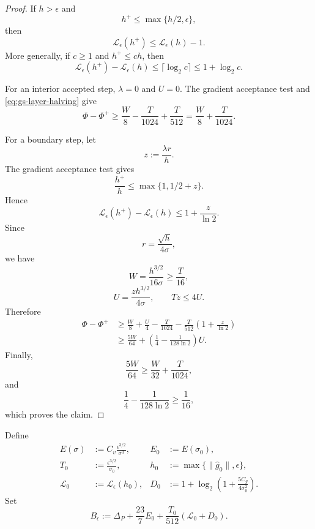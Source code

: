 \begin{proof}
If $h>\epsilon$ and
\[
    h^+\le\max\{h/2,\epsilon\},
\]
then
\begin{equation}
    \mathcal L_\epsilon(h^+)
    \le
    \mathcal L_\epsilon(h)-1.
    \label{eq:gs-layer-halving}
\end{equation}
More generally, if $c\ge1$ and $h^+\le ch$, then
\begin{equation}
    \mathcal L_\epsilon(h^+)
    -
    \mathcal L_\epsilon(h)
    \le
    \lceil\log_2c\rceil
    \le
    1+\log_2c.
    \label{eq:gs-layer-growth}
\end{equation}

For an interior accepted step,
$\lambda=0$ and $U=0$.
The gradient acceptance test and
\eqref{eq:gs-layer-halving} give
\[
    \Phi-\Phi^+
    \ge
    \frac W8
    -
    \frac T{1024}
    +
    \frac T{512}
    =
    \frac W8+\frac T{1024}.
\]

For a boundary step, let
\[
    z:=\frac{\lambda r}{h}.
\]
The gradient acceptance test gives
\[
    \frac{h^+}{h}
    \le
    \max\{1,1/2+z\}.
\]
Hence
\[
    \mathcal L_\epsilon(h^+)
    -
    \mathcal L_\epsilon(h)
    \le
    1+\frac z{\ln2}.
\]
Since
\[
    r=\frac{\sqrt h}{4\sigma},
\]
we have
\[
    W
    =
    \frac{h^{3/2}}{16\sigma}
    \ge
    \frac T{16},
\]
\[
    U
    =
    \frac{zh^{3/2}}{4\sigma},
    \qquad
    Tz\le4U.
\]
Therefore
\begin{align*}
    \Phi-\Phi^+
    &\ge
    \frac W8
    +
    \frac U4
    -
    \frac T{1024}
    -
    \frac T{512}
    \left(
        1+\frac z{\ln2}
    \right)
    \\
    &\ge
    \frac{5W}{64}
    +
    \left(
        \frac14-\frac1{128\ln2}
    \right)U.
\end{align*}
Finally,
\[
    \frac{5W}{64}
    \ge
    \frac W{32}
    +
    \frac T{1024},
\]
and
\[
    \frac14-\frac1{128\ln2}
    \ge
    \frac1{16},
\]
which proves the claim.
\end{proof}


Define
\begin{equation}
\begin{aligned}
    E(\sigma)
    &:=
    C_v\frac{\epsilon^{3/2}}{\sigma^3},
    &
    E_0
    &:=
    E(\sigma_0),
    \\
    T_0
    &:=
    \frac{\epsilon^{3/2}}{\sigma_0},
    &
    h_0
    &:=
    \max\{\|\widehat g_0\|,\epsilon\},
    \\
    \mathcal L_0
    &:=
    \mathcal L_\epsilon(h_0),
    &
    D_0
    &:=
    1+
    \log_2
    \left(
        1+\frac{5C_g}{4\sigma_0^2}
    \right).
\end{aligned}
\label{eq:gs-budget-parameters}
\end{equation}
Set
\begin{equation}
    B_\epsilon
    :=
    \Delta_P
    +
    \frac{23}{7}E_0
    +
    \frac{T_0}{512}
    (\mathcal L_0+D_0).
    \label{eq:gs-budget}
\end{equation}

